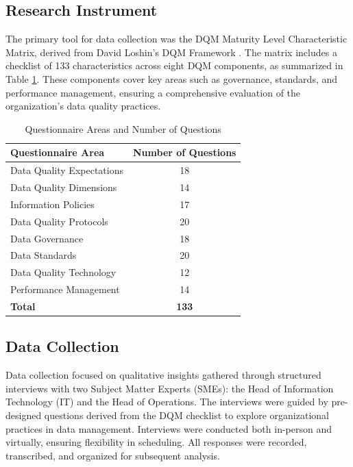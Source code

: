 \documentclass[conference]{IEEEtran}
\begin{document}
\subsection{Research Instrument}

The primary tool for data collection was the DQM Maturity Level Characteristic Matrix, derived from David Loshin’s DQM Framework \cite{loshin_dqi}. The matrix includes a checklist of 133 characteristics across eight DQM components, as summarized in Table \ref{tab:questionnaire}. These components cover key areas such as governance, standards, and performance management, ensuring a comprehensive evaluation of the organization’s data quality practices.

\begin{table}[h]
\caption{Questionnaire Areas and Number of Questions}
\label{tab:questionnaire}
\centering
\begin{tabular}{|l|c|}
\hline
\textbf{Questionnaire Area} & \textbf{Number of Questions} \\
\hline
Data Quality Expectations & 18 \\
Data Quality Dimensions & 14 \\
Information Policies & 17 \\
Data Quality Protocols & 20 \\
Data Governance & 18 \\
Data Standards & 20 \\
Data Quality Technology & 12 \\
Performance Management & 14 \\
\hline
\textbf{Total} & \textbf{133} \\
\hline
\end{tabular}
\end{table}

\subsection{Data Collection}

Data collection focused on qualitative insights gathered through structured interviews with two Subject Matter Experts (SMEs): the Head of Information Technology (IT) and the Head of Operations. The interviews were guided by pre-designed questions derived from the DQM checklist to explore organizational practices in data management. Interviews were conducted both in-person and virtually, ensuring flexibility in scheduling. All responses were recorded, transcribed, and organized for subsequent analysis.
\end{document}
